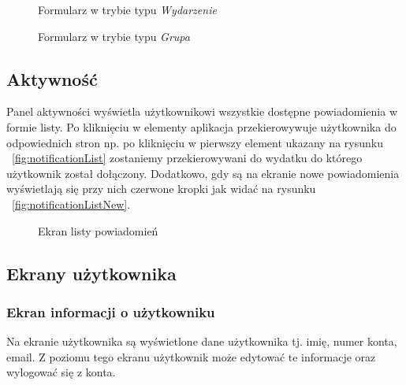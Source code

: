\begin{figure}[h!]%
    \centering
    \qquad
    \caption{Formularz w trybie typu \emph{Wydarzenie}}%
    \label{fig:example}%
\end{figure}

\begin{figure}[h!]%
    \centering
    \caption{Formularz w trybie typu \emph{Grupa}}
\end{figure}

\newpage
\subsection{Aktywność}
Panel aktywności wyświetla użytkownikowi wszystkie dostępne powiadomienia w formie listy. Po kliknięciu w elementy aplikacja przekierowywuje użytkownika do odpowiednich stron np. po kliknięciu w pierwszy element ukazany na rysunku ~\ref{fig:notificationList} zostaniemy przekierowywani do wydatku do którego użytkownik został dołączony. Dodatkowo, gdy są na ekranie nowe powiadomienia wyświetlają się przy nich czerwone kropki jak widać na rysunku ~\ref{fig:notificationListNew}.

\begin{figure}[h!]%
    \centering
    \qquad
    \caption{Ekran listy powiadomień}%
    \label{fig:example}%
\end{figure}

\newpage
\subsection{Ekrany użytkownika}
\subsubsection{Ekran informacji o użytkowniku}
Na ekranie użytkownika są wyświetlone dane użytkownika tj. imię, numer konta, email. Z poziomu tego ekranu użytkownik może edytować te informacje oraz wylogować się z konta.

